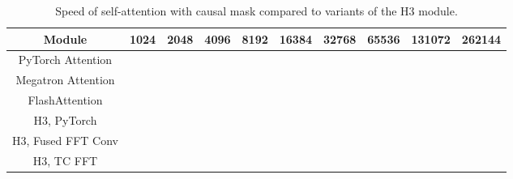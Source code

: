 \begin{table}[h]
    \small
    \centering
    \caption{\label{table:speed} Speed of self-attention with causal mask compared to variants of the H3 module.}
    {
        \begin{tabular}{@{}|c|ccccccccc|@{}}
        \hline
        Module & 1024 & 2048 & 4096 & 8192 & 16384 & 32768 & 65536 & 131072 & 262144\\ %
        \hline
        PyTorch Attention  \\
        Megatron Attention \\
        FlashAttention \\ \hline
        H3, PyTorch   \\
        H3, Fused FFT Conv  \\ 
        H3, TC FFT \\ \hline
        \end{tabular}
    }
\end{table}
